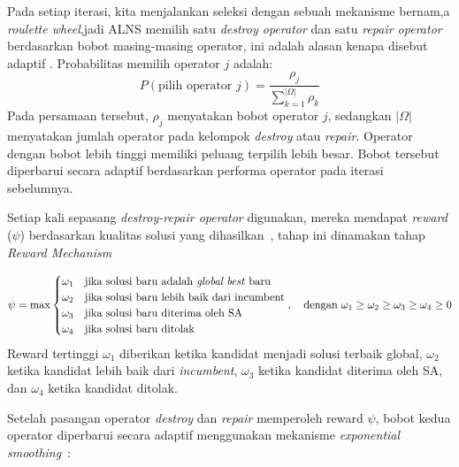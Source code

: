 \documentclass{file/TA-ITS}
\theoremstyle{definition}
\theoremstyle{definition}
\theoremstyle{plain}
\begin{document}
Pada setiap iterasi, kita menjalankan seleksi dengan sebuah mekanisme bernam,a \textit{roulette wheel},jadi ALNS memilih satu \textit{destroy operator} dan satu \textit{repair operator}  berdasarkan bobot masing-masing operator, ini adalah alasan kenapa disebut adaptif \cite{pisinger2018lns}. Probabilitas memilih operator $j$ adalah:
\begin{equation}
\label{eq:alns_roulette}
P(\text{pilih operator } j) = \frac{\rho_j}{\sum_{k=1}^{|\Omega|} \rho_k}
\end{equation}
Pada persamaan tersebut, $\rho_j$ menyatakan bobot operator $j$, sedangkan $|\Omega|$ menyatakan jumlah operator pada kelompok \textit{destroy} atau \textit{repair}. Operator dengan bobot lebih tinggi memiliki peluang terpilih lebih besar. Bobot tersebut diperbarui secara adaptif berdasarkan performa operator pada iterasi sebelumnya.


Setiap kali sepasang \textit{destroy-repair operator} digunakan, mereka mendapat \textit{reward} ($\psi$) berdasarkan kualitas solusi yang dihasilkan~\cite{pisinger2018lns}, tahap ini dinamakan tahap \textit{Reward Mechanism}

\begin{equation}
\label{eq:alns_reward}
\psi = \max \begin{cases}
    \omega_1 & \text{jika solusi baru adalah \textit{global best} baru} \\
    \omega_2 & \text{jika solusi baru lebih baik dari incumbent} \\
    \omega_3 & \text{jika solusi baru diterima oleh SA} \\
    \omega_4 & \text{jika solusi baru ditolak}
\end{cases}, \quad \text{dengan } \omega_1 \ge \omega_2 \ge \omega_3 \ge \omega_4 \ge 0
\end{equation}
Reward tertinggi $\omega_1$ diberikan ketika kandidat menjadi solusi terbaik global, $\omega_2$ ketika kandidat lebih baik dari \textit{incumbent}, $\omega_3$ ketika kandidat diterima oleh SA, dan $\omega_4$ ketika kandidat ditolak.

Setelah pasangan operator \textit{destroy} dan \textit{repair} memperoleh reward $\psi$, bobot kedua operator diperbarui secara adaptif menggunakan mekanisme \textit{exponential smoothing}~\cite{pisinger2018lns}:
\end{document}
